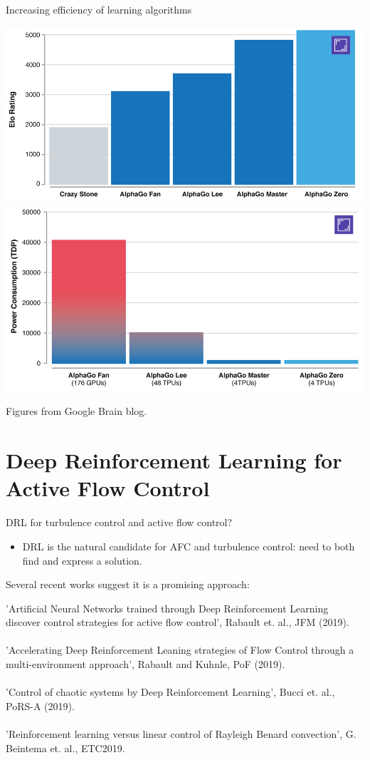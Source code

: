 \documentclass{beamer}
\begin{document}
\begin{frame}{Increasing efficiency of learning algorithms}
\begin{center}
		\includegraphics[width=0.58\linewidth]{Figures/ELO_ranking_DRL} \\
		\includegraphics[width=0.58\linewidth]{Figures/power_consumption_DRL}
	\end{center}
	{\tiny Figures from Google Brain blog.}
\end{frame}

\section{Deep Reinforcement Learning for Active Flow Control}

\begin{frame}{DRL for turbulence control and active flow control?}
    \begin{itemize}
        \item DRL is the natural candidate for AFC and turbulence control: need to both find and express a solution.
    \end{itemize}

    \begin{center}
    Several recent works suggest it is a promising approach:
    \end{center}

    'Artificial Neural Networks trained through Deep Reinforcement Learning discover control strategies for active flow control', Rabault et. al., JFM (2019). \\~\\

    'Accelerating Deep Reinforcement Leaning strategies of Flow Control through a multi-environment approach', Rabault and Kuhnle, PoF (2019). \\~\\

    'Control of chaotic systems by Deep Reinforcement Learning', Bucci et. al., PoRS-A (2019). \\~\\

    'Reinforcement learning versus linear control of Rayleigh Benard convection', G. Beintema et. al., ETC2019.
\end{frame}
\end{document}
